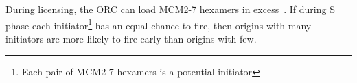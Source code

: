 	During licensing, the ORC can load MCM2-7 hexamers in excess~\cite{MultiMCM}.
	If during S phase each initiator\footnote{Each pair of MCM2-7 hexamers is a potential initiator} has an equal chance to fire, then origins with many initiators are more likely to fire early than origins with few.











































